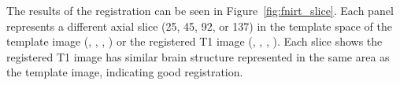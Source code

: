 \documentclass[a4paper]{report}\usepackage[]{graphicx}\usepackage[]{color}
\makeatletter
\newcommand\gobblepars{%
    \@ifnextchar\par%
        {\expandafter\gobblepars\@gobble}%
        {}}
\makeatother
\begin{document}
\begin{article}
\gobblepars

 
The results of the registration can be seen in Figure~\ref{fig:fnirt_slice}.  Each panel represents a different axial slice (25, 45, 92, or 137) in the template space of the template image (\protect{}, \protect{}, \protect{}, \protect{}) or the registered T1 image (\protect{}, \protect{}, \protect{}, \protect{}).  Each slice shows the registered T1 image has similar brain structure represented in the same area as the template image, indicating good registration.





\end{article}
\end{document}
